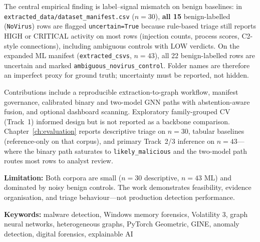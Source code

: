 The central empirical finding is label--signal mismatch on benign baselines: in \nolinkurl{extracted_data/dataset_manifest.csv} ($n{=}30$), \textbf{all 15} benign-labelled (\texttt{NoVirus}) rows are flagged \texttt{uncertain=True} because rule-based triage still reports HIGH or CRITICAL activity on most rows (injection counts, process scores, C2-style connections), including ambiguous controls with LOW verdicts. On the expanded ML manifest (\texttt{extracted\_csvs}, $n{=}43$), all 22 benign-labelled rows are uncertain and marked \texttt{ambiguous\_novirus\_control}. Folder names are therefore an imperfect proxy for ground truth; uncertainty must be reported, not hidden.

Contributions include a reproducible extraction-to-graph workflow, manifest governance, calibrated binary and two-model GNN paths with abstention-aware fusion, and optional dashboard scanning. Exploratory family-grouped CV (Track~1) informed design but is not reported as a backbone comparison. Chapter~\ref{ch:evaluation} reports descriptive triage on $n{=}30$, tabular baselines (reference-only on that corpus), and primary Track~2/3 inference on $n{=}43$---where the binary path saturates to \texttt{likely\_malicious} and the two-model path routes most rows to analyst review.

\textbf{Limitation:} Both corpora are small ($n{=}30$ descriptive, $n{=}43$ ML) and dominated by noisy benign controls. The work demonstrates feasibility, evidence organisation, and triage behaviour---not production detection performance.

\vspace{0.5cm}
\noindent\textbf{Keywords:} malware detection, Windows memory forensics, Volatility 3, graph neural networks, heterogeneous graphs, PyTorch Geometric, GINE, anomaly detection, digital forensics, explainable AI
